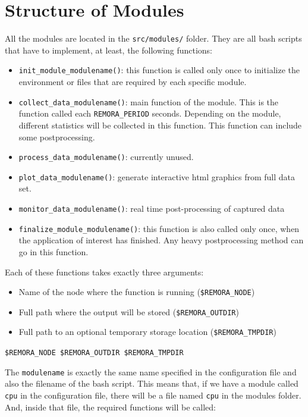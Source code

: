 \documentclass[10pt,a4paper]{report}
\begin{document}
\section{Structure of Modules}

All the modules are located in the \verb+src/modules/+ folder. They are all bash scripts that have to implement, at least, the following functions:

\begin{itemize}
	\item \texttt{init\_module\_modulename()}: this function is called only once to initialize the environment or files that are required by each specific module.
	\item \texttt{collect\_data\_modulename()}: main function of the module. This is the function called each \texttt{REMORA\_PERIOD} seconds. Depending on the module, different statistics will be collected in this function. This function can include some postprocessing.
	\item \texttt{process\_data\_modulename()}: currently unused.
	\item \texttt{plot\_data\_modulename()}: generate interactive html graphics from full data set.
	\item \texttt{monitor\_data\_modulename()}: real time post-processing of captured data
	\item \texttt{finalize\_module\_modulename()}: this function is also called only once, when the application of interest has finished. Any heavy postprocessing method can go in this function.
\end{itemize}

Each of these functions takes exactly three arguments: 

\begin{itemize}
\item Name of the node where the function is running (\texttt{\$REMORA\_NODE})
\item Full path where the output will be stored (\texttt{\$REMORA\_OUTDIR})
\item Full path to an optional temporary storage location (\texttt{\$REMORA\_TMPDIR})
\end{itemize}

\verb+$REMORA_NODE $REMORA_OUTDIR $REMORA_TMPDIR+

The \texttt{modulename} is exactly the same name specified in the configuration file and also the filename of the bash script. This means that, if we have a module called \texttt{cpu} in the configuration file, there will be a file named \texttt{cpu} in the modules folder. And, inside that file, the required functions will be called:
\end{document}
